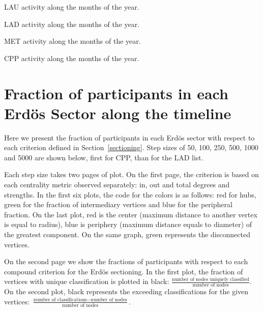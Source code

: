 \documentclass[%
	aip,
	jmp,%
	amsmath,amssymb,
	reprint,%
	floatfix,
]{revtex4-1}
\begin{document}
							\begin{table}[!h]
								\caption{LAU activity along the months of the year.}
								\footnotesize
								
								\label{tab:min2}
							\end{table}
							\begin{table}[!h]
								\caption{LAD activity along the months of the year.}
								\footnotesize
								
								\label{tab:min2}
							\end{table}
							\begin{table}[!h]
								\caption{MET activity along the months of the year.}
								\footnotesize
								
								\label{tab:min2}
							\end{table}

							\begin{table}[!h]
								\caption{CPP activity along the months of the year.}
								\footnotesize
								
								\label{tab:min2}
							\end{table}



							\section{Fraction of participants in each Erd\"os Sector along the timeline}\label{si:frac}
							Here we present the fraction of participants in each Erd\"os sector with respect to each criterion defined in Section~\ref{sectioning}. Step sizes of 50, 100, 250, 500, 1000 and 5000 are shown below, first for CPP, than for the LAD list.

							Each step size takes two pages of plot. On the first page, the criterion is based on each centrality metric observed separately: in, out and total degrees and strengths. In the first six plots, the code for the colors is as follows: red for hubs, green for the fraction of intermediary vertices and blue for the peripheral fraction. On the last plot, red is the center (maximum distance to another vertex is equal to radius), blue is periphery (maximum distance equals to diameter) of the greatest component. On the same graph, green represents the disconnected vertices.

							On the second page we show the fractions of participants with respect to each compound criterion for the Erd\"os sectioning. In the first plot, the fraction of vertices with unique classification is plotted in black: $\frac{\text{number of nodes uniquely classified}}{\text{number of nodes}}$. On the second plot, black represents the exceeding classifications for the given vertices: $\frac{\text{number of classifications} - \text{number of nodes}}{\text{number of nodes}}$.
\end{document}
